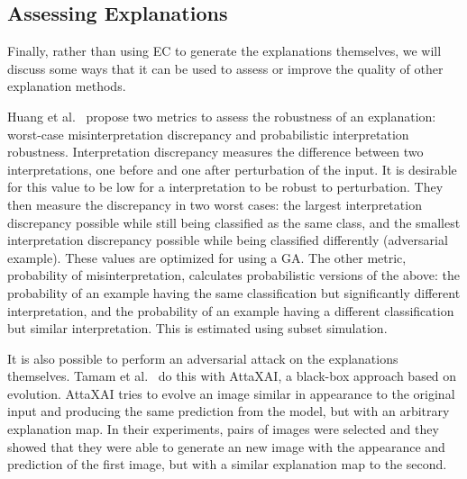 \documentclass[graybox]{svmult}
\begin{document}
\subsection{Assessing Explanations}

Finally, rather than using EC to generate the explanations themselves, we will discuss some ways that it can be used to assess or improve the quality of other explanation methods.

Huang et al.~\cite{huangSAFARIVersatileEfficient2022} propose two metrics to assess the robustness of an explanation: worst-case misinterpretation discrepancy and probabilistic interpretation robustness. Interpretation discrepancy measures the difference between two interpretations, one before and one after perturbation of the input. It is desirable for this value to be low for a interpretation to be robust to perturbation. They then measure the discrepancy in two worst cases: the largest interpretation discrepancy possible while still being classified as the same class, and the smallest interpretation discrepancy possible while being classified differently (adversarial example). These values are optimized for using a GA. The other metric, probability of misinterpretation, calculates probabilistic versions of the above: the probability of an example having the same classification but significantly different interpretation, and the probability of an example having a different classification but similar interpretation. This is estimated using subset simulation.

It is also possible to perform an adversarial attack on the explanations themselves. Tamam et al.~\cite{tamamFoilingExplanationsDeep2022} do this with AttaXAI, a black-box approach based on  evolution. AttaXAI tries to evolve an image similar in appearance to the original input and producing the same prediction from the model, but with an arbitrary explanation map. In their experiments, pairs of images were selected and they showed that they were able to generate an new image with the appearance and prediction of the first image, but with a similar explanation map to the second.


\end{document}
